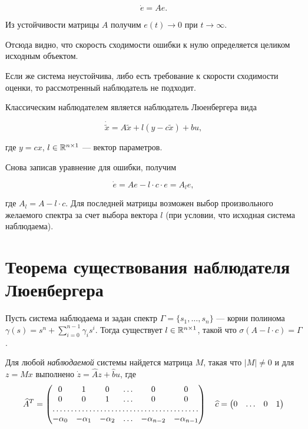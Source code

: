 \documentclass[../../TAU.tex]{subfiles}
\begin{document}
    $$
        \dot e = A e.
    $$
    
    Из устойчивости матрицы $A$ получим $e(t)\rightarrow0$ при $t\rightarrow\infty$.

    Отсюда видно, что скорость сходимости ошибки к нулю определяется целиком исходным объектом.

    Если же система неустойчива, либо есть требование к скорости сходимости оценки, то рассмотренный наблюдатель не подходит.

    Классическим наблюдателем является наблюдатель Люенбергера вида
    
    $$
        \dot{\tilde x} = A\tilde x + l (y-c\tilde x) + b u,
    $$
    
    где $y = cx$, $l\in\mathbb{R}^{n\times 1}$ --- вектор параметров.

    Снова записав уравнение для ошибки, получим
    
    $$
        \dot e = A e - l\cdot c\cdot e = A_l e,
    $$
    
    где $A_l = A-l\cdot c$. Для последней матрицы возможен выбор произвольного желаемого спектра за счет выбора вектора $l$ (при условии, что исходная система наблюдаема).

\section{Теорема существования наблюдателя Люенбергера}

    \begin{theor}
        Пусть система  наблюдаема и задан спектр $\Gamma=\{s_1,\ldots, s_n\}$ --- корни полинома $\gamma(s)=s^n+\sum_{i=0}^{n-1}\gamma_i s^i$.
        Тогда существует $l\in\mathbb{R}^{n\times 1}$, такой что $\sigma(A-l\cdot c) = \Gamma$.
    \end{theor}

    \begin{statement}
        Для любой {\it наблюдаемой} системы  найдется матрица $M$, такая что $|M|\neq0$ и для $z=Mx$ выполнено
        $\dot z = \widehat A z + \widehat b u$,
        где
        $$
        \widehat A^T =
        \begin{pmatrix}
            0& 1& 0& \ldots& 0& 0\\
            0& 0& 1& \ldots& 0& 0\\
            \hdotsfor{6}\\
            -\alpha_0& -\alpha_1& -\alpha_2 &\ldots& -\alpha_{n-2}& -\alpha_{n-1}
        \end{pmatrix}\quad
        \widehat c=
        \begin{pmatrix}
            0 & \ldots & 0 & 1
        \end{pmatrix}
        $$
    \end{statement}
\end{document}
